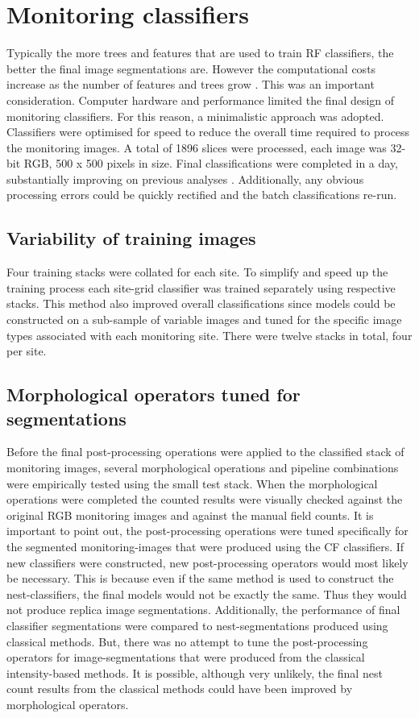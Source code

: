 \section{Monitoring classifiers}
Typically the more trees and features that are used to train \ac{RF} classifiers, the better the final image segmentations are. However the computational costs increase as the number of features and trees grow \cite{Latinne2001}. This was an important consideration. Computer hardware and performance limited the final design of monitoring classifiers. For this reason, a minimalistic approach was adopted. Classifiers were optimised for speed to reduce the overall time required to process the monitoring images. A total of 1896 slices were processed, each image was 32-bit RGB, 500 x 500 pixels in size. Final classifications were completed in a day, substantially improving on previous analyses \cite{Hart2004,Hart2007,Hart2011,Hart2012,Hart2014}. Additionally, any obvious processing errors could be quickly rectified and the batch classifications re-run.

\subsection{Variability of training images}\label{sec:training-stacks}
Four training stacks were collated for each site. To simplify and speed up the training process each site-grid classifier was trained separately using respective stacks. This method also improved overall classifications since models could be constructed on a sub-sample of variable images and tuned for the specific image types associated with each monitoring site. There were twelve stacks in total, four per site.

\subsection{Morphological operators tuned for segmentations}\label{sec:post-processing}
Before the final post-processing operations were applied to the classified stack of monitoring images, several morphological operations and pipeline combinations were empirically tested using the small test stack. When the morphological operations were completed the counted results were visually checked against the original \ac{RGB} monitoring images and against the manual field counts.
It is important to point out, the post-processing operations were tuned specifically for the segmented monitoring-images that were produced using the CF classifiers. If new classifiers were constructed, new post-processing operators would most likely be necessary. This is because even if the same method is used to construct the nest-classifiers, the final models would not be exactly the same. Thus they would not produce replica image segmentations.
Additionally, the performance of final classifier segmentations were compared to nest-segmentations produced using classical methods. But, there was no attempt to tune the post-processing operators for image-segmentations that were produced from the classical intensity-based methods. It is possible, although very unlikely, the final nest count results from the classical methods could have been improved by morphological operators.

